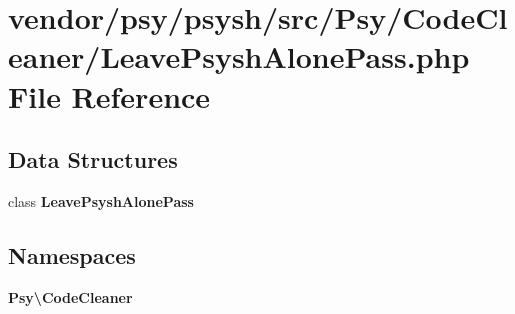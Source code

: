 \section{vendor/psy/psysh/src/\+Psy/\+Code\+Cleaner/\+Leave\+Psysh\+Alone\+Pass.php File Reference}
\label{_leave_psysh_alone_pass_8php}
\subsection*{Data Structures}
\begin{DoxyCompactItemize}
\item 
class {\bf Leave\+Psysh\+Alone\+Pass}
\end{DoxyCompactItemize}
\subsection*{Namespaces}
\begin{DoxyCompactItemize}
\item 
 {\bf Psy\textbackslash{}\+Code\+Cleaner}
\end{DoxyCompactItemize}
